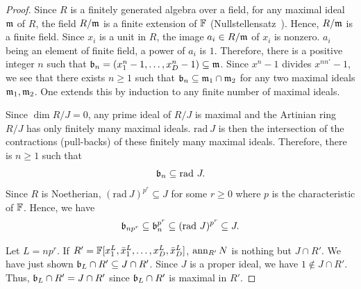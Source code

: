 \begin{proof}
Since $R$ is a finitely generated algebra over a field,
for any maximal ideal $\mathfrak{m}$ of $R$, the field $R/\mathfrak{m}$ is a finite extension of $\mathbb{F}$
(Nullstellensatz~\cite[Theorem~4.19]{Eisenbud}).
Hence, $R/\mathfrak{m}$ is a finite field.
Since $x_i$ is a unit in $R$, the image $a_i \in R/\mathfrak{m}$ of $x_i$ is nonzero.
$a_i$ being an element of finite field, a power of $a_i$ is $1$.
Therefore, there is a positive integer $n$ such that
$\mathfrak{b}_n = (x_1^n-1,\ldots,x_D^n-1) \subseteq \mathfrak{m}$.
Since $x^n-1$ divides $x^{nn'}-1$,
we see that there exists $n \ge 1$ such that $\mathfrak{b}_n \subseteq \mathfrak{m}_1 \cap \mathfrak{m}_2$
for any two maximal ideals $\mathfrak{m}_1, \mathfrak{m}_2$.
One extends this by induction to any finite number of maximal ideals.

Since $\dim R/J = 0$, any prime ideal of $R/J$ is maximal and 
the Artinian ring $R/J$ has only finitely many maximal ideals.
$\mathrm{rad}~ J$ is then the intersection of the contractions (pull-backs)
of these finitely many maximal ideals.
Therefore, there is $n \ge 1$ such that
\[
 \mathfrak{b}_n \subseteq \mathrm{rad}~ J .
\]
Since $R$ is Noetherian, $(\mathrm{rad}~J)^{p^r} \subseteq J$ for some $r \ge 0$
where $p$ is the characteristic of $\mathbb{F}$. Hence, we have 
\[
\mathfrak{b}_{np^r} \subseteq \mathfrak{b}_n^{p^r} \subseteq (\mathrm{rad}~J)^{p^r} \subseteq J.
\]

Let $L = np^r$.
If $R' = \mathbb{F}[x_1^L,\bar x_1^L,\ldots,x_D^L,\bar x_D^L]$,
$\mathop{\mathrm{ann}}\nolimits_{R'} N$ is nothing but $J \cap R'$.
We have just shown $\mathfrak{b}_L \cap R' \subseteq J \cap R'$.
Since $J$ is a proper ideal, we have $1 \notin J \cap R'$.
Thus, $\mathfrak{b}_L \cap R'= J \cap R'$ since $\mathfrak{b}_L \cap R'$ is maximal in $R'$.
\end{proof}


